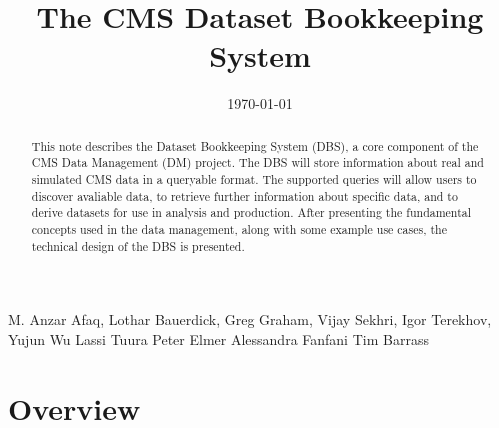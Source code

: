 \documentclass[pdftex]{cmspaper}
\begin{document}

\begin{titlepage}

   \date{\today}

  \title{The CMS Dataset Bookkeeping System}


  \begin{Authlist}
    M. Anzar Afaq, Lothar Bauerdick, Greg Graham, Vijay Sekhri, Igor Terekhov, 
    Yujun Wu
    Lassi Tuura
    Peter Elmer
    Alessandra Fanfani
    Tim Barrass
  \end{Authlist}


  \begin{abstract}
    This note describes the Dataset Bookkeeping System (DBS), a core component 
    of the CMS Data Management (DM) project.  The DBS will store information
    about real and simulated CMS data in a queryable format.  The supported
    queries will allow users to discover avaliable data, to retrieve further 
    information about specific data, and to derive datasets for use in 
    analysis and production. After presenting the fundamental concepts used
    in the data management, along with some example use cases, the technical 
    design of the DBS is presented.
  \end{abstract} 

  
\end{titlepage}

\setcounter{page}{2}%
\tableofcontents

\section{Overview}
\label{sec:intro}
\end{document}
